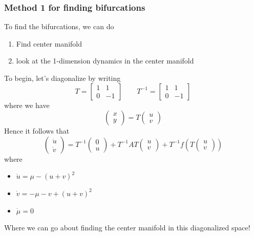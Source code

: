 \documentclass{article}
\begin{document}
\subsubsection{Method 1 for finding bifurcations}

To find the bifurcations, we can do 
\begin{enumerate}
    \item Find center manifold
    \item look at the 1-dimension dynamics in the center manifold
\end{enumerate}
To begin, let's diagonalize by writing 
\[
T = \begin{bmatrix}
    1 & 1 \\ 0 & -1
\end{bmatrix}\qquad T^{-1} = \begin{bmatrix}
    1 & 1 \\ 0 & -1
\end{bmatrix}
\]
where we have 
\[
\begin{pmatrix}
    x \\ y
\end{pmatrix} = T \begin{pmatrix}
    u \\ v
\end{pmatrix}
\]
Hence it follows that 
\[
\begin{pmatrix}
    \dot{u} \\ \dot{v}
\end{pmatrix} = T^{-1}\begin{pmatrix}
    0 \\ u
\end{pmatrix} + T^{-1}AT \begin{pmatrix}
    u \\ v
\end{pmatrix} + T^{-1}f\left( T\begin{pmatrix}
    u \\ v
\end{pmatrix} \right)
\]
where 
\begin{itemize}
    \item $\dot{u}=\mu -(u+v )^2$
    \item $\dot{v} = -\mu - v +(u+v )^2$
    \item $\dot{\mu}=0$
\end{itemize}
Where we can go about finding the center manifold in this diagonalized space!
\end{document}
